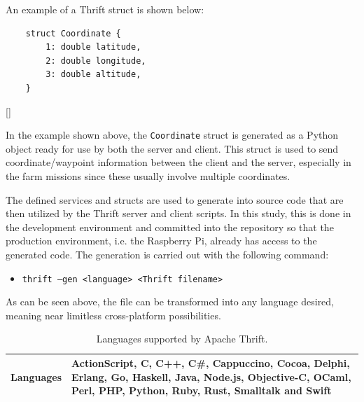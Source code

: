 \newpage
An example of a Thrift struct is shown below:
\begin{verbatim}
    struct Coordinate {
        1: double latitude,
        2: double longitude,
        3: double altitude,
    }
\end{verbatim}[]


In the example shown above, the \texttt{Coordinate} struct is generated as a Python object ready for use by both the server and client. This struct is used to send coordinate/waypoint information between the client and the server, especially in the farm missions since these usually involve multiple coordinates.

The defined services and structs are used to generate into source code that are then utilized by the Thrift server and client scripts. In this study, this is done in the development environment and committed into the repository so that the production environment, i.e. the Raspberry Pi, already has access to the generated code. The generation is carried out with the following command:

\begin{itemize}
  \item \texttt{thrift --gen <language> <Thrift filename>}
\end{itemize}

As can be seen above, the file can be transformed into any language desired, meaning near limitless cross-platform possibilities. 

\begin{table}[t]
 \caption{Languages supported by Apache Thrift.}
 \linespread{0.7}\selectfont
 \begin{center}
     \begin{tabular}{|m{5cm}|m{8cm}|} 
     \hline
     \textbf{Languages} & ActionScript, C, C++, C\#, Cappuccino, Cocoa, Delphi, Erlang, Go, Haskell, Java, Node.js, Objective-C, OCaml, Perl, PHP, Python, Ruby, Rust, Smalltalk and Swift \\ 
     [1ex] 
     \hline
 \end{tabular}
 \end{center}{}
 \label{table:thriftlang}
\end{table}
\FloatBarrier

